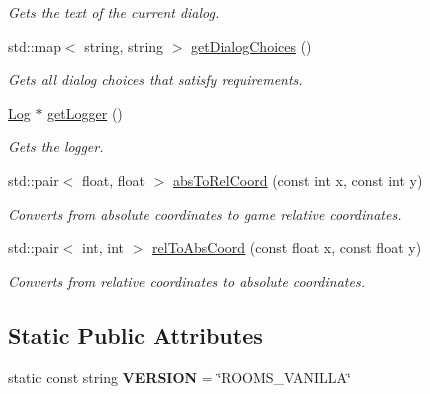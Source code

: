 \begin{DoxyCompactItemize}
\begin{DoxyCompactList}\small\item\em Gets the text of the current dialog. \item\end{DoxyCompactList}\item 
\hypertarget{classEngine_aa9b1c41224f5489c7bdc34c3d64ecb98}{
std::map$<$ string, string $>$ \hyperlink{classEngine_aa9b1c41224f5489c7bdc34c3d64ecb98}{getDialogChoices} ()}
\label{classEngine_aa9b1c41224f5489c7bdc34c3d64ecb98}

\begin{DoxyCompactList}\small\item\em Gets all dialog choices that satisfy requirements. \item\end{DoxyCompactList}\item 
\hypertarget{classEngine_aad7e63c8e6f99b7a8383f6259905957c}{
\hyperlink{classLog}{Log} $\ast$ \hyperlink{classEngine_aad7e63c8e6f99b7a8383f6259905957c}{getLogger} ()}
\label{classEngine_aad7e63c8e6f99b7a8383f6259905957c}

\begin{DoxyCompactList}\small\item\em Gets the logger. \item\end{DoxyCompactList}\item 
std::pair$<$ float, float $>$ \hyperlink{classEngine_a3b5e52d55ab6d60b98843e275d77c506}{absToRelCoord} (const int x, const int y)
\begin{DoxyCompactList}\small\item\em Converts from absolute coordinates to game relative coordinates. \item\end{DoxyCompactList}\item 
std::pair$<$ int, int $>$ \hyperlink{classEngine_ae841f1b67f20d9f996b867b5f13df42b}{relToAbsCoord} (const float x, const float y)
\begin{DoxyCompactList}\small\item\em Converts from relative coordinates to absolute coordinates. \item\end{DoxyCompactList}\end{DoxyCompactItemize}
\subsection*{Static Public Attributes}
\begin{DoxyCompactItemize}
\item 
\hypertarget{classEngine_ab18b172f434c24caf414b2668f341841}{
static const string {\bfseries VERSION} = \char`\"{}ROOMS\_\-VANILLA\char`\"{}}
\label{classEngine_ab18b172f434c24caf414b2668f341841}

\end{DoxyCompactItemize}
